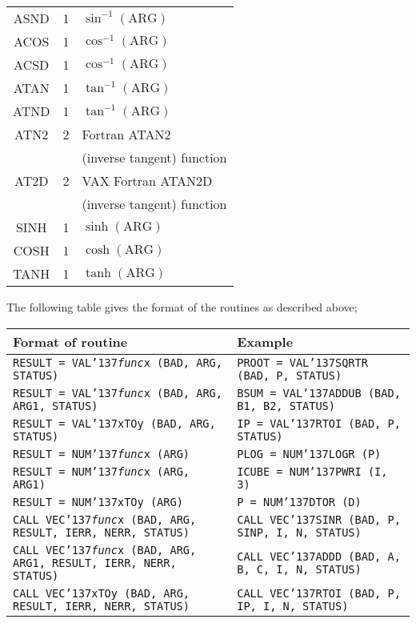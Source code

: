 \documentclass[twoside,11pt]{article}
\renewcommand{\_}{{\tt\char'137}}
\begin{document}
{\begin{tabular}{|c|c|l|}
ASND & 1 & $\sin ^{-1}(\mbox{ARG})$ \\
ACOS & 1 & $\cos ^{-1}(\mbox{ARG})$ \\
ACSD & 1 & $\cos ^{-1}(\mbox{ARG})$ \\
ATAN & 1 & $\tan ^{-1}(\mbox{ARG})$ \\
ATND & 1 & $\tan ^{-1}(\mbox{ARG})$ \\
ATN2 & 2 & Fortran ATAN2 \\
     &   & (inverse tangent) function \\
AT2D & 2 & VAX Fortran ATAN2D\\
     &   & (inverse tangent) function \\
SINH & 1 & $\sinh (\mbox{ARG})$ \\
COSH & 1 & $\cosh (\mbox{ARG})$ \\
TANH & 1 & $\tanh (\mbox{ARG})$ \\ \hline
\end{tabular}
}

\newpage
The following table gives the format of the routines as described above;

{\small
\begin{tabular}{|l|l|} \hline
Format of routine & Example\\ \hline
{\tt RESULT = VAL\_{\sl func\/}x (BAD, ARG, STATUS)}& 
{\tt PROOT = VAL\_SQRTR (BAD, P, STATUS)} \\
{\tt RESULT = VAL\_{\sl func\/}x (BAD, ARG, ARG1, STATUS)}&
{\tt BSUM = VAL\_ADDUB (BAD, B1, B2, STATUS)} \\
{\tt RESULT = VAL\_xTOy (BAD, ARG, STATUS)}& 
{\tt IP = VAL\_RTOI (BAD, P, STATUS)} \\
{\tt RESULT = NUM\_{\sl func\/}x (ARG)}& 
{\tt PLOG = NUM\_LOGR (P)} \\
{\tt RESULT = NUM\_{\sl func\/}x (ARG, ARG1)}& 
{\tt ICUBE = NUM\_PWRI (I, 3)} \\
{\tt RESULT = NUM\_xTOy (ARG)}& 
{\tt P = NUM\_DTOR (D)} \\
{\tt CALL VEC\_{\sl func\/}x (BAD, ARG, RESULT, IERR, NERR, STATUS)}& 
{\tt CALL VEC\_SINR (BAD, P, SINP, I, N, STATUS)} \\
{\tt CALL VEC\_{\sl func\/}x (BAD, ARG, ARG1, RESULT, IERR, NERR, STATUS)}& 
{\tt CALL VEC\_ADDD (BAD, A, B, C, I, N, STATUS)} \\
{\tt CALL VEC\_xTOy (BAD, ARG, RESULT, IERR, NERR, STATUS)}& 
{\tt CALL VEC\_RTOI (BAD, P, IP, I, N, STATUS)} \\
\hline
\end{tabular}
}
\end{document}
